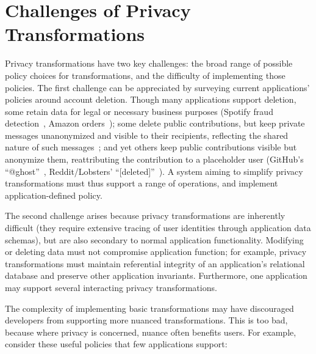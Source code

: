 \section{Challenges of Privacy Transformations}
\label{sec:motivation}
%

%
Privacy transformations have two key challenges: the broad
range of possible policy choices for transformations, and the difficulty of
implementing those policies.
%
The first challenge can be appreciated by surveying current applications' policies
around account deletion.
%
Though many applications support deletion,
some retain
data for legal or necessary business purposes (\eg Spotify fraud detection~\cite{spotify:privacy},
Amazon orders~\cite{amazon:privacy}); some delete public contributions, but keep private
messages unanonymized and visible to their recipients, reflecting the
shared nature of such messages~\cite{facebook:privacy, twitter:privacy};
and yet others keep public contributions visible but anonymize them, reattributing the contribution
to a placeholder user (\eg GitHub's ``@ghost''~\cite{github:privacy}, Reddit/Lobsters'
``[deleted]''~\cite{reddit:privacy, lobsters:privacy}).
%
A system aiming to simplify privacy transformations must thus support a range
of operations, and implement application-defined policy.


The second challenge arises because privacy transformations are
inherently difficult (they require extensive tracing of user identities through
application data schemas), but are also secondary to normal application
functionality.
%
Modifying or deleting data must not compromise application function; for example, privacy
transformations must maintain referential integrity of an application's relational database
and preserve other application invariants.
%
Furthermore, one application may support several interacting privacy
transformations.


The complexity of implementing basic transformations may have discouraged
developers from supporting more nuanced transformations.
%
This is too bad, because where privacy is concerned, nuance often benefits
users.
%
For example, consider these useful policies that few applications
support:
%

